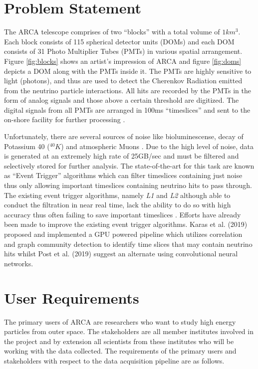 \section{Problem Statement}
\label{sec:soc}

The ARCA telescope comprises of two ``blocks'' with a total volume of
$1km^{3}$. Each block consists of 115 spherical detector units (DOMs)
and each DOM consists of 31 Photo Multiplier Tubes (PMTs) in various
spatial arrangement. Figure \ref{fig:blocks} shows an artist's
impression of ARCA and figure \ref{fig:doms} depicts a DOM along with
the PMTs inside it. The PMTs are highly sensitive to light (photons),
and thus are used to detect the Cherenkov Radiation emitted from the
neutrino particle interactions. All hits are recorded by the PMTs in
the form of analog signals and those above a certain threshold are
digitized. The digital signals from all PMTs are arranged in 100ms
``timeslices'' and sent to the on-shore facility for further
processing \cite{aiello2019km3net}.

Unfortunately, there are several sources of noise like
bioluminescense, decay of Potassium 40 ($^{40}K$) and atmospheric
Muons \cite{post2019km3nnet}. Due to the high level of noise, data is
generated at an extremely high rate of 25GB/sec
\cite{adrian2016letter} and must be filtered and selectively stored
for further analysis. The state-of-the-art for this task are known as
``Event Trigger'' algorithms \cite{adrian2016letter,aiello2019km3net}
which can filter timeslices containing just noise thus only allowing
important timeslices containing neutrino hits to pass through. The
existing event trigger algorithms, namely \emph{L1} and \emph{L2}
although able to conduct the filtration in near real time, lack the
ability to do so with high accuracy thus often failing to save
important timeslices \cite{karas2019data}. Efforts have already been
made to improve the existing event trigger algorithms. Karas et al.
(2019) proposed and implemented a GPU powered pipeline which utilizes
correlation and graph community detection to identify time slices that
may contain neutrino hits whilst Post et al. (2019) suggest an
alternate using convolutional neural networks.

\section{User Requirements}
\label{sec:user-req}

The primary users of ARCA are researchers who want to study high
energy particles from outer space. The stakeholders are all member
institutes involved in the project and by extension all scientists
from these institutes who will be working with the data collected. The
requirements of the primary users and stakeholders with respect to the
data acquisition pipeline are as follows.

